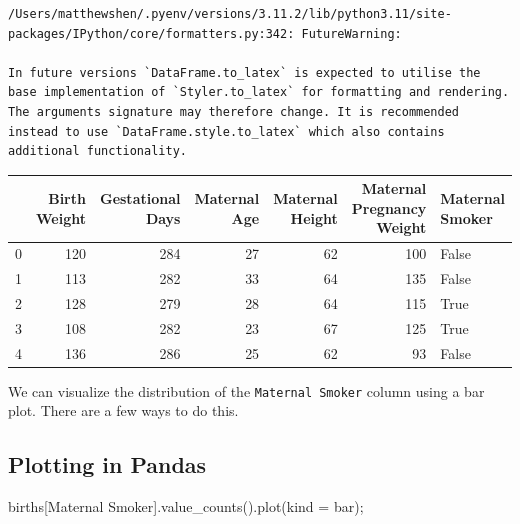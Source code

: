 \documentclass[
  letterpaper,
  DIV=11,
  numbers=noendperiod]{scrreprt}
\newenvironment{Shaded}{\begin{snugshade}}{\end{snugshade}}
\newcommand{\NormalTok}[1]{\textcolor[rgb]{0.00,0.23,0.31}{#1}}
\newcommand{\OperatorTok}[1]{\textcolor[rgb]{0.37,0.37,0.37}{#1}}
\newcommand{\StringTok}[1]{\textcolor[rgb]{0.13,0.47,0.30}{#1}}
\begin{document}
\begin{verbatim}
/Users/matthewshen/.pyenv/versions/3.11.2/lib/python3.11/site-packages/IPython/core/formatters.py:342: FutureWarning:

In future versions `DataFrame.to_latex` is expected to utilise the base implementation of `Styler.to_latex` for formatting and rendering. The arguments signature may therefore change. It is recommended instead to use `DataFrame.style.to_latex` which also contains additional functionality.
\end{verbatim}

\begin{tabular}{lrrrrrl}
\toprule
{} &  Birth Weight &  Gestational Days &  Maternal Age &  Maternal Height &  Maternal Pregnancy Weight &  Maternal Smoker \\
\midrule
0 &           120 &               284 &            27 &               62 &                        100 &            False \\
1 &           113 &               282 &            33 &               64 &                        135 &            False \\
2 &           128 &               279 &            28 &               64 &                        115 &             True \\
3 &           108 &               282 &            23 &               67 &                        125 &             True \\
4 &           136 &               286 &            25 &               62 &                         93 &            False \\
\bottomrule
\end{tabular}

We can visualize the distribution of the \texttt{Maternal\ Smoker}
column using a bar plot. There are a few ways to do this.

\hypertarget{plotting-in-pandas}{%
\subsection{Plotting in Pandas}\label{plotting-in-pandas}}

\begin{Shaded}
\begin{Highlighting}[]
\NormalTok{births[}\StringTok{\textquotesingle{}Maternal Smoker\textquotesingle{}}\NormalTok{].value\_counts().plot(kind }\OperatorTok{=} \StringTok{\textquotesingle{}bar\textquotesingle{}}\NormalTok{)}\OperatorTok{;}
\end{Highlighting}
\end{Shaded}
\end{document}
